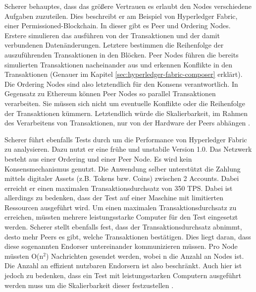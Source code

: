 Scherer behauptes, dass das größere Vertrauen es erlaubt den Nodes verschiedene Aufgaben zuzuteilen. Dies beschreibt er am Beispiel von Hyperledger Fabric, einer Permissioned-Blockchain. In dieser gibt es Peer und Ordering Nodes. Erstere simulieren das ausführen von der Transaktionen und der damit verbundenen Datenänderungen. Letztere bestimmen die Reihenfolge der auszuführenden Transaktionen in den Blöcken. Peer Nodes führen die bereits simulierten Transaktionen nacheinander aus und erkennen Konflikte in den Transaktionen (Genauer im Kapitel \ref{sec:hyperledger-fabric-composer} erklärt). Die Ordering Nodes sind also letztendlich für den Konsens verantwortlich. In Gegensatz zu Ethereum können Peer Nodes so parallel Transaktionen verarbeiten. Sie müssen sich nicht um eventuelle Konflikte oder die Reihenfolge der Transaktionen kümmern. Letztendlich würde die Skalierbarkeit, im Rahmen des Verarbeitens von Transaktionen, nur von der Hardware der Peers abhängen \cite{SchererPerformanceScalabilityBlockchain2017}.

Scherer führt ebenfalls Tests durch um die Performance von Hyperledger Fabric zu analysieren. Dazu nutzt er eine frühe und unstabile Version 1.0. Das Netzwerk besteht aus einer Ordering und einer Peer Node. Es wird kein Konsensmechanismus genutzt. Die Anwendung selber unterstützt die Zahlung mittels digitaler Assets (z.B. Tokens bzw. Coins) zwischen 2 Accounts. Dabei erreicht er einen maximalen Transaktionsdurchsatz von 350 TPS. Dabei ist allerdings zu bedenken, dass der Test auf einer Maschine mit limitierten Ressourcen ausgeführt wird. Um einen maximalen Transaktionsdurchsatz zu erreichen, müssten mehrere leistungsstarke Computer für den Test eingesetzt werden. Scherer stellt ebenfalls fest, dass der Transaktionsdurchsatz abnimmt, desto mehr Peers es gibt, welche Transaktionen bestätigen. Dies liegt daran, dass diese sogenannten Endorser untereinander kommunizieren müssen. Pro Node müssten O(n$^2$) Nachrichten gesendet werden, wobei n die Anzahl an Nodes ist. Die Anzahl an effizient nutzbaren Endorsern ist also beschränkt. Auch hier ist jedoch zu bedenken, dass ein Test mit leistungsstarken Computern ausgeführt werden muss um die Skalierbarkeit dieser festzustellen \cite{SchererPerformanceScalabilityBlockchain2017}.

